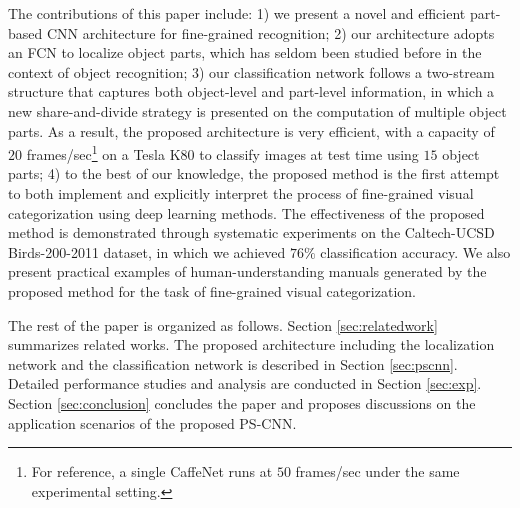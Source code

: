 \documentclass[10pt,twocolumn,letterpaper]{article}
\begin{document}
The contributions of this paper include: 1) we present a novel and efficient part-based CNN architecture for fine-grained recognition; 2) our architecture adopts an FCN to localize object parts, which has seldom been studied before in the context of object recognition; 3) our classification network follows a two-stream structure that captures both object-level and part-level information, in which a new share-and-divide strategy is presented on the computation of multiple object parts. As a result, the proposed architecture is very efficient, with a capacity of $20$ frames/sec\footnote{For reference, a single CaffeNet runs at $50$ frames/sec under the same experimental setting.} on a Tesla K80 to classify images at test time using $15$ object parts; 4) to the best of our knowledge, the proposed method is the first attempt to both implement and explicitly interpret the process of fine-grained visual categorization using deep learning methods.
The effectiveness of the proposed method is demonstrated through systematic experiments on the Caltech-UCSD Birds-200-2011 \cite{wah2011caltech} dataset, in which we achieved $76\%$ classification accuracy. We also present practical examples of human-understanding manuals generated by the proposed method for the task of fine-grained visual categorization.






The rest of the paper is organized as follows. Section \ref{sec:relatedwork} summarizes related works. The proposed architecture including the localization network and the classification network is described in Section \ref{sec:pscnn}.
Detailed performance studies and analysis are conducted in Section \ref{sec:exp}. Section \ref{sec:conclusion} concludes the paper and proposes discussions on the application scenarios of the proposed PS-CNN.
\end{document}

